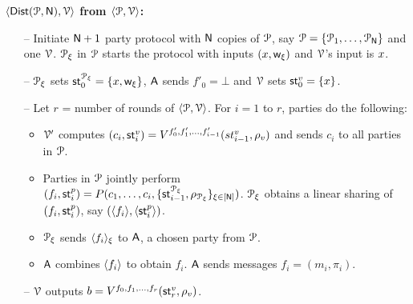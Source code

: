 
\textbf{$\langle \mathsf{Dist}(\mathcal{P}, \mathsf{N}),\mathcal{V}\rangle$ from $\langle \mathcal{P},\mathcal{V}\rangle$:}
\begin{itemize}
	\item[--] Initiate $\mathsf{N} + 1$ party protocol with $\mathsf{N}$ copies of $\mathcal{P}$, say $\mathcal{P} = \{\mathcal{P}_1, \ldots, \mathcal{P}_{\mathsf{N}}\}$ and one $\mathcal{V}$. $\mathcal{P}_\xi$ in $\mathcal{P}$ starts the protocol with inputs $({x}, \mathsf{w}_\xi)$ and $\mathcal{V}$'s input is ${x}$.
	\item[--] $\mathcal{P}_\xi$ sets $\mathsf{st}^{\mathcal{P}_\xi}_0 = \{{x}, \mathsf{w}_{\xi}\}$, $\mathsf{A}$ sends $f'_0 = \bot$ and $\mathcal{V}$ sets $\mathsf{st}^v_0 = \{{x}\}$.
	\item[--] Let $r$ = number of rounds of $\langle \mathcal{P},\mathcal{V}\rangle$. 
	For $i = 1$ to $r$, parties do the following:
	\begin{itemize}
		\item $\mathcal{V}'$ computes $(c_i,\mathsf{st}^v_i) = V^{f'_0, f'_1, \ldots, f'_{i-1}}(st^v_{i-1}, \rho_v)$ and sends $c_i$ to all parties in $\mathcal{P}$.
		\item Parties in $\mathcal{P}$ jointly perform 
		\\$(f_i, \mathsf{st}^p_i) = P(c_1,\ldots, c_i, \{\mathsf{st}^{\mathcal{P}_\xi}_{i-1} , \rho_{\mathcal{P}_\xi}\}_{\xi \in [\mathsf{N}]})$. $\mathcal{P}_\xi$ obtains a linear sharing of $(f_i, \mathsf{st}^p_i)$, say $(\langle f_i \rangle, \langle \mathsf{st}^p_i \rangle)$.
		\item $\mathcal{P}_\xi$ sends $\langle f_i \rangle_{\xi}$ to $\mathsf{A}$, a chosen party from $\mathcal{P}$.
		\item $\mathsf{A}$ combines $\langle f_i \rangle$ to obtain $f_i$. $\mathsf{A}$ sends messages $f_i=(m_i, \pi_i)$.
	\end{itemize}	
	\item[--] $\mathcal{V}$ outputs $b = V^{f_0, f_1, \ldots, f_r} ( \mathsf{st}^v_r , \rho_v)$.
\end{itemize}

